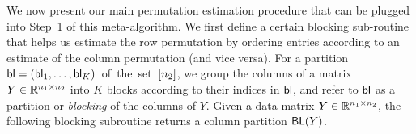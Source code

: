 \documentclass[final,12pt]{colt2018} %
\begin{document}
%

We now present our main permutation estimation procedure that can be plugged into Step~1 of this meta-algorithm. We first define a certain blocking sub-routine that helps us estimate the row permutation by ordering entries according to an estimate of the column permutation (and vice versa).
%
%
For a partition \mbox{$\mathsf{bl} = (\mathsf{bl}_1, \dots, \mathsf{bl}_K)$ of
  the set $[n_2]$}, we group the columns of a matrix $Y \in
\mathbb{R}^{n_1 \times n_2}$ into $K$ blocks according to their
indices in $\mathsf{bl}$, and refer to $\mathsf{bl}$ as a partition or \emph{blocking}
of the columns of $Y$.
Given a data matrix $Y \in \mathbb{R}^{n_1 \times n_2}$, the
following blocking subroutine returns a column partition $\mathsf{BL}(Y)$. 

\end{document}
